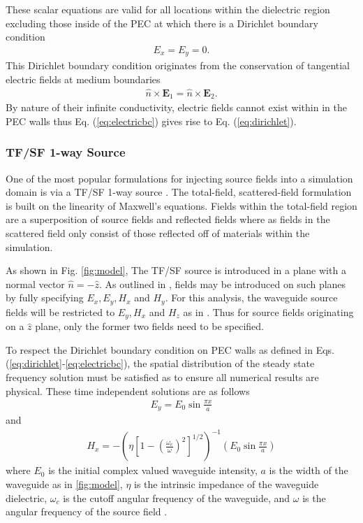 These scalar equations are valid for all locations within the dielectric region excluding those inside of the PEC at which there is a Dirichlet boundary condition
\begin{align}
	E_x=E_y=0.
	\label{eq:dirichlet}
\end{align}
This Dirichlet boundary condition originates from the conservation of tangential electric fields at medium boundaries 
\begin{align}
	\hat{n}\times\textbf{E}_1=\hat{n}\times\textbf{E}_2.
	\label{eq:electricbc}
\end{align}
By nature of their infinite conductivity, electric fields cannot exist within in the PEC walls thus Eq. (\ref{eq:electricbc}) gives rise to Eq. (\ref{eq:dirichlet}).

\subsubsection{TF/SF 1-way Source}
\label{subsubsec:ftsf-mod}
One of the most popular formulations for injecting source fields into a simulation domain is via a TF/SF 1-way source \cite{taftlovefdtd}. The total-field, scattered-field formulation is built on the linearity of Maxwell's equations. Fields within the total-field region are a superposition of source fields and reflected fields where as fields in the scattered field only consist of those reflected off of materials within the simulation.

As shown in Fig. \ref{fig:model}, The TF/SF source is introduced in a plane with a normal vector $\hat{n}=-\hat{z}$. As outlined in \cite{taftlovefdtd}, fields may be introduced on such planes by fully specifying $E_x, E_y, H_x$ and $H_y$. For this analysis, the waveguide source fields will be restricted to $E_y, H_x$ and $H_z$ as in \cite{fieldsandwavescomm}. Thus for source fields originating on a $\hat{z}$ plane, only the former two fields need to be specified. 

To respect the Dirichlet boundary condition on PEC walls as defined in  Eqs. (\ref{eq:dirichlet}-\ref{eq:electricbc}), the spatial distribution of the steady state frequency solution must be satisfied as to ensure all numerical results are physical. These time independent solutions are as follows
\begin{align}
	E_y=E_0\sin{\frac{\pi x}{a}}
	\label{eq:eyfreq}
\end{align}
and
\begin{align}
	H_x = -\left(\eta\left[1-\left(\frac{\omega_c}{\omega}\right)^2\right]^{1/2}\right)^{-1}\left(E_0\sin{\frac{\pi x}{a}}\right)
	\label{eq:hxfreq}
\end{align}
where $E_0$ is the initial complex valued waveguide intensity, $a$ is the width of the waveguide as in \ref{fig:model}, $\eta$ is the intrinsic impedance of the waveguide dielectric, $\omega_c$ is the cutoff angular frequency of the waveguide, and $\omega$ is the angular frequency of the source field \cite{fieldsandwavescomm}.

